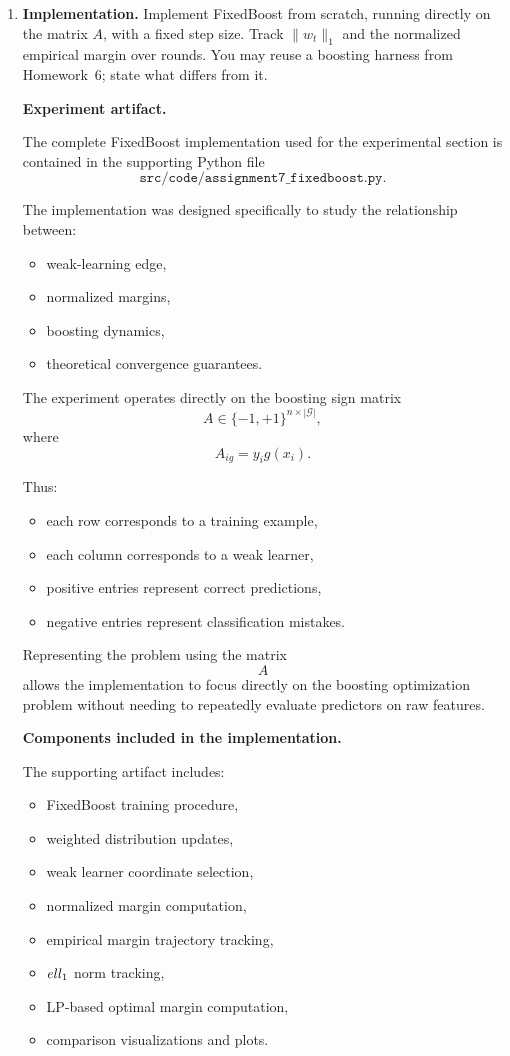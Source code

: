\documentclass[11pt]{article}
\begin{document}
\begin{enumerate}

\item \textbf{Implementation.}
Implement FixedBoost from scratch, running directly on the matrix $A$, with a fixed step 
size. Track $\|w_t\|_{1}$ and the normalized empirical margin over rounds. You may reuse a 
boosting harness from Homework~6; state what differs from it.

\begin{solutionbox}

\textbf{Experiment artifact.}

The complete FixedBoost implementation used for the experimental section is contained in the supporting Python file
\[
\texttt{src/code/assignment7\_fixedboost.py}.
\]

The implementation was designed specifically to study the relationship between:
\begin{itemize}
    \item weak-learning edge,
    \item normalized margins,
    \item boosting dynamics,
    \item theoretical convergence guarantees.
\end{itemize}

The experiment operates directly on the boosting sign matrix
\[
A\in\{-1,+1\}^{n\times |\mathcal G|},
\]
where
\[
A_{ig}=y_ig(x_i).
\]

Thus:
\begin{itemize}
    \item each row corresponds to a training example,
    \item each column corresponds to a weak learner,
    \item positive entries represent correct predictions,
    \item negative entries represent classification mistakes.
\end{itemize}

Representing the problem using the matrix
\[
A
\]
allows the implementation to focus directly on the boosting optimization problem without needing to repeatedly evaluate predictors on raw features.

\medskip

\textbf{Components included in the implementation.}

The supporting artifact includes:
\begin{itemize}
    \item FixedBoost training procedure,
    \item weighted distribution updates,
    \item weak learner coordinate selection,
    \item normalized margin computation,
    \item empirical margin trajectory tracking,
    \item $\\ell_1$ norm tracking,
    \item LP-based optimal margin computation,
    \item comparison visualizations and plots.
\end{itemize}


\end{solutionbox}
\end{enumerate}
\end{document}
